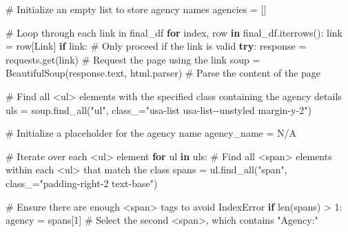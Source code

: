 \documentclass[
  letterpaper,
  DIV=11,
  numbers=noendperiod]{scrartcl}
\newenvironment{Shaded}{\begin{snugshade}}{\end{snugshade}}
\newcommand{\BuiltInTok}[1]{\textcolor[rgb]{0.00,0.23,0.31}{#1}}
\newcommand{\CommentTok}[1]{\textcolor[rgb]{0.37,0.37,0.37}{#1}}
\newcommand{\ControlFlowTok}[1]{\textcolor[rgb]{0.00,0.23,0.31}{\textbf{#1}}}
\newcommand{\DecValTok}[1]{\textcolor[rgb]{0.68,0.00,0.00}{#1}}
\newcommand{\KeywordTok}[1]{\textcolor[rgb]{0.00,0.23,0.31}{\textbf{#1}}}
\newcommand{\NormalTok}[1]{\textcolor[rgb]{0.00,0.23,0.31}{#1}}
\newcommand{\OperatorTok}[1]{\textcolor[rgb]{0.37,0.37,0.37}{#1}}
\newcommand{\StringTok}[1]{\textcolor[rgb]{0.13,0.47,0.30}{#1}}
\begin{document}
\begin{Shaded}
\begin{Highlighting}[]
\CommentTok{\# Initialize an empty list to store agency names}
\NormalTok{agencies }\OperatorTok{=}\NormalTok{ []}

\CommentTok{\# Loop through each link in final\_df}
\ControlFlowTok{for}\NormalTok{ index, row }\KeywordTok{in}\NormalTok{ final\_df.iterrows():}
\NormalTok{    link }\OperatorTok{=}\NormalTok{ row[}\StringTok{\textquotesingle{}Link\textquotesingle{}}\NormalTok{]}
    \ControlFlowTok{if}\NormalTok{ link:  }\CommentTok{\# Only proceed if the link is valid}
        \ControlFlowTok{try}\NormalTok{:}
\NormalTok{            response }\OperatorTok{=}\NormalTok{ requests.get(link)  }\CommentTok{\# Request the page using the link}
\NormalTok{            soup }\OperatorTok{=}\NormalTok{ BeautifulSoup(response.text, }\StringTok{\textquotesingle{}html.parser\textquotesingle{}}\NormalTok{)  }\CommentTok{\# Parse the content of the page}

            \CommentTok{\# Find all \textless{}ul\textgreater{} elements with the specified class containing the agency details}
\NormalTok{            uls }\OperatorTok{=}\NormalTok{ soup.find\_all(}\StringTok{"ul"}\NormalTok{, class\_}\OperatorTok{=}\StringTok{"usa{-}list usa{-}list{-}{-}unstyled margin{-}y{-}2"}\NormalTok{)}
            
            \CommentTok{\# Initialize a placeholder for the agency name}
\NormalTok{            agency\_name }\OperatorTok{=} \StringTok{\textquotesingle{}N/A\textquotesingle{}}
            
            \CommentTok{\# Iterate over each \textless{}ul\textgreater{} element}
            \ControlFlowTok{for}\NormalTok{ ul }\KeywordTok{in}\NormalTok{ uls:}
                \CommentTok{\# Find all \textless{}span\textgreater{} elements within each \textless{}ul\textgreater{} that match the class}
\NormalTok{                spans }\OperatorTok{=}\NormalTok{ ul.find\_all(}\StringTok{"span"}\NormalTok{, class\_}\OperatorTok{=}\StringTok{"padding{-}right{-}2 text{-}base"}\NormalTok{)}
                
                \CommentTok{\# Ensure there are enough \textless{}span\textgreater{} tags to avoid IndexError}
                \ControlFlowTok{if} \BuiltInTok{len}\NormalTok{(spans) }\OperatorTok{\textgreater{}} \DecValTok{1}\NormalTok{:}
\NormalTok{                    agency }\OperatorTok{=}\NormalTok{ spans[}\DecValTok{1}\NormalTok{]  }\CommentTok{\# Select the second \textless{}span\textgreater{}, which contains "Agency:"}
                    

\end{Highlighting}
\end{Shaded}
\end{document}
